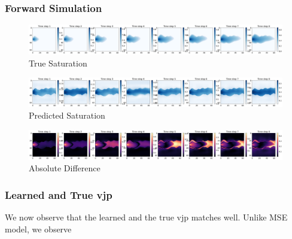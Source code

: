 \documentclass[
]{article}
\begin{document}
\subsubsection{Forward Simulation}\label{forward-simulation-1}

\begin{figure}[H]

{\centering \includegraphics[width=1\textwidth,height=\textheight]{../../plot/GCS_channel_plot/FNO_GCS_lowest_JAC_True.png}

}

\caption{True Saturation}

\end{figure}%
\begin{figure}[H]

{\centering \includegraphics[width=1\textwidth,height=\textheight]{../../plot/GCS_channel_plot/FNO_GCS_lowest_JAC_Pred.png}

}

\caption{Predicted Saturation}

\end{figure}%
\begin{figure}[H]

{\centering \includegraphics[width=1\textwidth,height=\textheight]{../../plot/GCS_channel_plot/FNO_GCS_lowest_JAC_diff.png}

}

\caption{Absolute Difference}

\end{figure}%

\subsubsection{Learned and True vjp}\label{learned-and-true-vjp}

We now observe that the learned and the true vjp matches well. Unlike
MSE model, we observe
\end{document}
